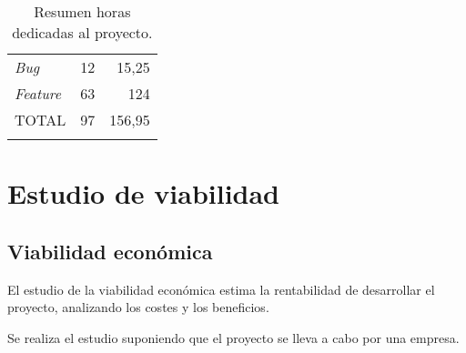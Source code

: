 \begin{longtable}[]{@{}lrr@{}}
\begin{minipage}[t]{0.37\columnwidth}\raggedright\strut
\emph{Bug}\strut
\end{minipage} & \begin{minipage}[t]{0.19\columnwidth}\raggedright\strut
12\strut
\end{minipage} & \begin{minipage}[t]{0.19\columnwidth}\raggedright\strut
15,25\strut
\end{minipage}\tabularnewline


\begin{minipage}[t]{0.37\columnwidth}\raggedright\strut
\emph{Feature}\strut
\end{minipage} & \begin{minipage}[t]{0.19\columnwidth}\raggedright\strut
63\strut
\end{minipage} & \begin{minipage}[t]{0.19\columnwidth}\raggedright\strut
124\strut
\end{minipage}\tabularnewline
\midrule

\begin{minipage}[t]{0.37\columnwidth}\raggedright\strut
TOTAL\strut
\end{minipage} & \begin{minipage}[t]{0.19\columnwidth}\raggedright\strut
97\strut
\end{minipage} & \begin{minipage}[t]{0.19\columnwidth}\raggedright\strut
156,95\strut
\end{minipage}\tabularnewline
\bottomrule
\caption{Resumen horas dedicadas al proyecto.}
\end{longtable}



\newpage

\section{Estudio de viabilidad}

\subsection{Viabilidad económica}

El estudio de la viabilidad económica estima la rentabilidad de desarrollar el proyecto, analizando los costes y los beneficios.

Se realiza el estudio suponiendo que el proyecto se lleva a cabo por una empresa.

